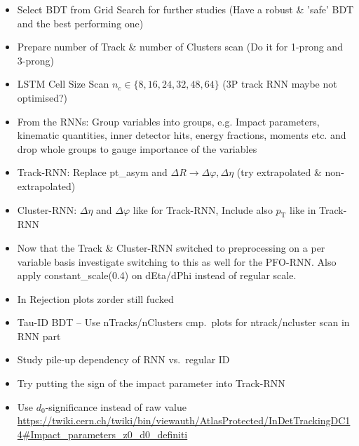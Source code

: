 \begin{itemize}
\item Select BDT from Grid Search for further studies (Have a robust \& 'safe'
  BDT and the best performing one)
\item Prepare number of Track \& number of Clusters scan (Do it for 1-prong and
  3-prong)
\item LSTM Cell Size Scan $n_c \in \{8, 16, 24, 32, 48, 64\}$ (3P track RNN
  maybe not optimised?)
\item From the RNNs: Group variables into groups, e.g. Impact parameters,
  kinematic quantities, inner detector hits, energy fractions, moments etc. and
  drop whole groups to gauge importance of the variables
\item Track-RNN: Replace pt\_asym and $\Delta R \rightarrow \Delta\varphi,
  \Delta\eta$ (try extrapolated \& non-extrapolated)
\item Cluster-RNN: $\Delta\eta$ and $\Delta\varphi$ like for Track-RNN, Include
  also $p_\text{T}$ like in Track-RNN
\item Now that the Track \& Cluster-RNN switched to preprocessing on a per
  variable basis investigate switching to this as well for the PFO-RNN. Also
  apply constant\_scale(0.4) on dEta/dPhi instead of regular scale.
\item In Rejection plots zorder still fucked
\item Tau-ID BDT -- Use nTracks/nClusters cmp.\ plots for ntrack/ncluster scan
  in RNN part
\item Study pile-up dependency of RNN vs.\ regular ID
\item Try putting the sign of the impact parameter into Track-RNN
\item Use $d_0$-significance instead of raw value
  \url{https://twiki.cern.ch/twiki/bin/viewauth/AtlasProtected/InDetTrackingDC14#Impact_parameters_z0_d0_definiti}
\end{itemize}


